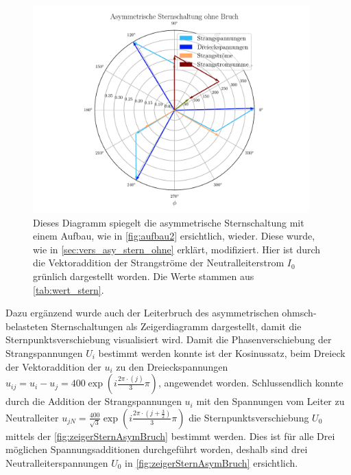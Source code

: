 \documentclass[12pt,english,ngerman]{scrartcl}
\begin{document}
\begin{figure}[H]
	\begin{center}
		\includegraphics[width = 0.95\textwidth]{figures/zeigerSternAsymOhneBruch.pdf}
	\end{center}
	\caption[Zeigerdiagramm einer asymmetrisch ohmsch-belastete Sternschaltung ohne
		Neutralleiterbruch]{Dieses Diagramm spiegelt die asymmetrische Sternschaltung
		mit einem Aufbau, wie in \autoref{fig:aufbau2} ersichtlich, wieder. Diese
		wurde, wie in \autoref{sec:vers_asy_stern_ohne} erklärt, modifiziert. Hier ist
		durch die Vektoraddition der Strangströme der Neutralleiterstrom $I_0$ grünlich
		dargestellt worden. Die Werte stammen aus \autoref{tab:wert_stern}.
	}\label{fig:zeigerSternAsymOhneBruch}
\end{figure}

Dazu ergänzend wurde auch der Leiterbruch des asymmetrischen ohmsch-belasteten
Sternschaltungen als Zeigerdiagramm dargestellt, damit die
Sternpunktsverschiebung visualisiert wird. Damit die Phasenverschiebung der
Strangspannungen $U_i$ bestimmt werden konnte ist der Kosinussatz, beim Dreieck
der Vektoraddition der $u_i$ zu den Dreieckspannungen $u_{ij} = u_i-u_j =
	400\exp(i\frac{2\pi\cdot(j)}{3}\pi)$, angewendet worden. Schlussendlich konnte
durch die Addition der Strangspannungen $u_i$ mit den Spannungen vom Leiter zu
Neutralleiter $u_{jN} =
	\frac{400}{\sqrt{3}}\exp(i\frac{2\pi\cdot(j+\frac{3}{2})}{3}\pi)$ die
Sternpunktsverschiebung $U_0$ mittels der \autoref{fig:zeigerSternAsymBruch}
bestimmt werden. Dies ist für alle Drei möglichen Spannungsadditionen
durchgeführt worden, deshalb sind drei Neutralleiterspannungen $U_0$ in
\autoref{fig:zeigerSternAsymBruch} ersichtlich.
\end{document}

